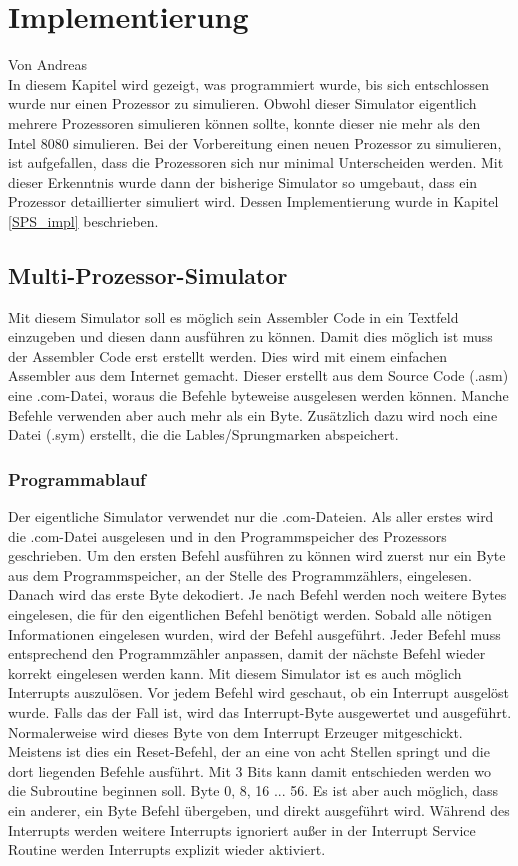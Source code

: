 \documentclass[12pt]{article}
\begin{document}
\newpage

\section{Implementierung}
Von Andreas
\\
\noindent
In diesem Kapitel wird gezeigt, was programmiert wurde, bis sich entschlossen wurde nur einen Prozessor zu simulieren. Obwohl dieser Simulator eigentlich mehrere Prozessoren simulieren können sollte, konnte dieser nie mehr als den Intel 8080 simulieren. Bei der Vorbereitung einen neuen Prozessor zu simulieren, ist aufgefallen, dass die Prozessoren sich nur minimal Unterscheiden werden. Mit dieser Erkenntnis wurde dann der bisherige Simulator so umgebaut, dass ein Prozessor detaillierter simuliert wird. Dessen Implementierung wurde in Kapitel \ref{SPS_impl} beschrieben.


\subsection{Multi-Prozessor-Simulator}
Mit diesem Simulator soll es möglich sein Assembler Code in ein Textfeld einzugeben und diesen dann ausführen zu können. Damit dies möglich ist muss der Assembler Code erst erstellt werden. Dies wird mit einem einfachen Assembler aus dem Internet gemacht. Dieser erstellt aus dem Source Code (.asm) eine .com-Datei, woraus die Befehle byteweise ausgelesen werden können. Manche Befehle verwenden aber auch mehr als ein Byte. Zusätzlich dazu wird noch eine Datei (.sym) erstellt, die die Lables/Sprungmarken abspeichert.
\noindent


\subsubsection{Programmablauf}
Der eigentliche Simulator verwendet nur die .com-Dateien. Als aller erstes wird die .com-Datei ausgelesen und in den Programmspeicher des Prozessors geschrieben. Um den ersten Befehl ausführen zu können wird zuerst nur ein Byte aus dem Programmspeicher, an der Stelle des Programmzählers, eingelesen. Danach wird das erste Byte dekodiert. 
Je nach Befehl werden noch weitere Bytes eingelesen, die für den eigentlichen Befehl benötigt werden. Sobald alle nötigen Informationen eingelesen wurden, wird der Befehl ausgeführt. Jeder Befehl muss entsprechend den Programmzähler anpassen, damit der nächste Befehl wieder korrekt eingelesen werden kann. Mit diesem Simulator ist es auch möglich Interrupts auszulösen. Vor jedem Befehl wird geschaut, ob ein Interrupt ausgelöst wurde. Falls das der Fall ist, wird das Interrupt-Byte ausgewertet und ausgeführt. Normalerweise wird dieses Byte von dem Interrupt Erzeuger mitgeschickt. Meistens ist dies ein Reset-Befehl, der an eine von acht Stellen springt und die dort liegenden Befehle ausführt. Mit 3 Bits kann damit entschieden werden wo die Subroutine beginnen soll. Byte 0, 8, 16 ... 56. Es ist aber auch möglich, dass ein anderer, ein Byte Befehl übergeben, und direkt ausgeführt wird. Während des Interrupts werden weitere Interrupts ignoriert außer in der Interrupt Service Routine werden Interrupts explizit wieder aktiviert.
\end{document}
